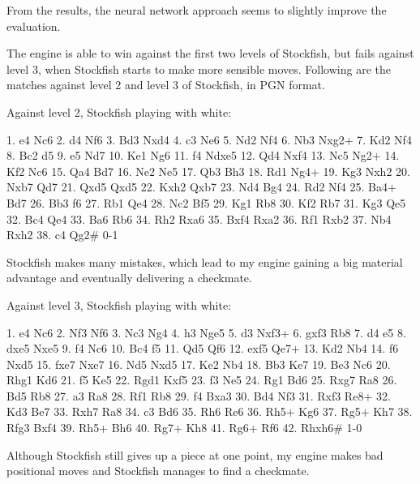 From the results, the neural network approach seems to slightly improve the evaluation.

The engine is able to win against the first two levels of Stockfish, but fails against level 3, when Stockfish starts to make more sensible moves. Following are the matches against level 2 and level 3 of Stockfish, in PGN format.

Against level 2, Stockfish playing with white:

1. e4 Nc6 2. d4 Nf6 3. Bd3 Nxd4 4. c3 Ne6 5. Nd2 Nf4 6. Nb3 Nxg2+ 7. Kd2 Nf4 8. Bc2 d5 9. e5 Nd7 10. Ke1 Ng6 11. f4 Ndxe5 12. Qd4 Nxf4 13. Nc5 Ng2+ 14. Kf2 Nc6 15. Qa4 Bd7 16. Ne2 Ne5 17. Qb3 Bh3 18. Rd1 Ng4+ 19. Kg3 Nxh2 20. Nxb7 Qd7 21. Qxd5 Qxd5 22. Kxh2 Qxb7 23. Nd4 Bg4 24. Rd2 Nf4 25. Ba4+ Bd7 26. Bb3 f6 27. Rb1 Qe4 28. Nc2 Bf5 29. Kg1 Rb8 30. Kf2 Rb7 31. Kg3 Qe5 32. Bc4 Qe4 33. Ba6 Rb6 34. Rh2 Rxa6 35. Bxf4 Rxa2 36. Rf1 Rxb2 37. Nb4 Rxh2 38. c4 Qg2\# 0-1

Stockfish makes many mistakes, which lead to my engine gaining a big material advantage and eventually delivering a checkmate.

Against level 3, Stockfish playing with white:

1. e4 Nc6 2. Nf3 Nf6 3. Nc3 Ng4 4. h3 Nge5 5. d3 Nxf3+ 6. gxf3 Rb8 7. d4 e5 8. dxe5 Nxe5 9. f4 Nc6 10. Bc4 f5 11. Qd5 Qf6 12. exf5 Qe7+ 13. Kd2 Nb4 14. f6 Nxd5 15. fxe7 Nxe7 16. Nd5 Nxd5 17. Ke2 Nb4 18. Bb3 Ke7 19. Be3 Nc6 20. Rhg1 Kd6 21. f5 Ke5 22. Rgd1 Kxf5 23. f3 Ne5 24. Rg1 Bd6 25. Rxg7 Ra8 26. Bd5 Rb8 27. a3 Ra8 28. Rf1 Rb8 29. f4 Bxa3 30. Bd4 Nf3 31. Rxf3 Re8+ 32. Kd3 Be7 33. Rxh7 Ra8 34. c3 Bd6 35. Rh6 Re6 36. Rh5+ Kg6 37. Rg5+ Kh7 38. Rfg3 Bxf4 39. Rh5+ Bh6 40. Rg7+ Kh8 41. Rg6+ Rf6 42. Rhxh6\# 1-0

Although Stockfish still gives up a piece at one point, my engine makes bad positional moves and Stockfish manages to find a checkmate.